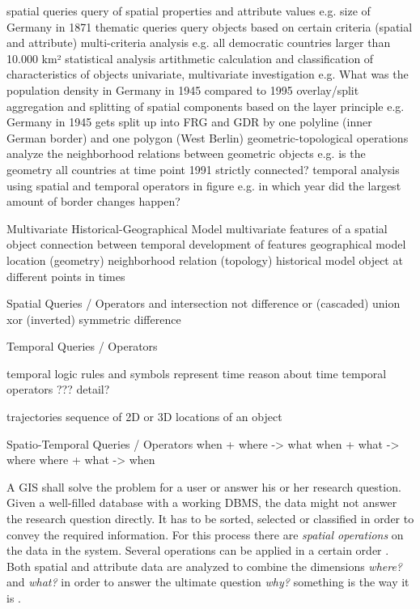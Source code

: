 spatial queries
  query of spatial properties and attribute values
  e.g. size of Germany in 1871
thematic queries
  query objects based on certain criteria (spatial and attribute)
  multi-criteria analysis
  e.g. all democratic countries larger than 10.000 km²
statistical analysis
  artithmetic calculation and classification of characteristics of objects
  univariate, multivariate investigation
  e.g. What was the population density in Germany in 1945 compared to 1995
overlay/split
  aggregation and splitting of spatial components based on the layer principle
  e.g. Germany in 1945 gets split up into FRG and GDR by one polyline (inner German border) and one polygon (West Berlin)
geometric-topological operations
  analyze the neighborhood relations between geometric objects
  e.g. is the geometry all countries at time point 1991 strictly connected?
temporal analysis
  using spatial and temporal operators in figure
  e.g. in which year did the largest amount of border changes happen?
\cite[p. 129-140]{ott2001time}

Multivariate Historical-Geographical Model
  multivariate
    features of a spatial object
    connection between temporal development of features
  geographical model
    location (geometry)
    neighborhood relation (topology)
  historical model
    object at different points in times
  \cite[p. 128]{ott2001time}

Spatial Queries / Operators
  and     intersection
  not     difference
  or      (cascaded) union
  xor     (inverted) symmetric difference

Temporal Queries / Operators

temporal logic
  rules and symbols
  represent time
  reason about time
  temporal operators
  ??? detail?

  trajectories
    sequence of 2D or 3D locations of an object

Spatio-Temporal Queries / Operators
  when + where -> what
  when + what -> where
  where + what -> when


A GIS shall solve the problem for a user or answer his or her research question. Given a well-filled database with a working DBMS, the data might not answer the research question directly. It has to be sorted, selected or classified in order to convey the required information. For this process there are \emph{spatial operations} on the data in the system. Several operations can be applied in a certain order
\cite[pp. 321-325]{bolstad2008gis}.
Both spatial and attribute data are analyzed to combine the dimensions \emph{where?} and \emph{what?} in order to answer the ultimate question \emph{why?} something is the way it is
\cite[p.xii-xvi]{knowles2002past}.

